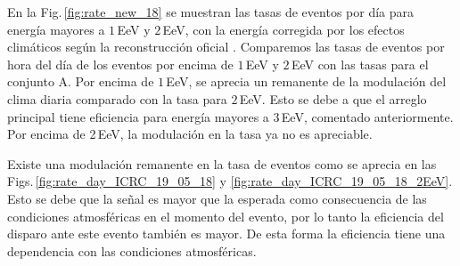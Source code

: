    En la Fig.\,\ref{fig:rate_new_18} se muestran las tasas de eventos por día para energía mayores a $1\,$EeV y $2\,$EeV, con la energía corregida por los efectos climáticos según la reconstrucción oficial \cite{data}.  Comparemos las tasas de eventos por hora del día de los eventos por encima de $1\,$EeV y $2\,$EeV con las tasas para el conjunto  A. Por encima de $1\,$EeV, se aprecia un remanente de la modulación del clima diaria comparado con la tasa para $2\,$EeV. Esto se debe a que el arreglo principal tiene eficiencia para energía mayores a $3\,$EeV, comentado anteriormente. Por encima de 2\,EeV, la modulación en la tasa ya no es apreciable. 


   Existe una modulación remanente en la tasa de eventos como se aprecia en las Figs.\,\ref{fig:rate_day_ICRC_19_05_18} y \ref{fig:rate_day_ICRC_19_05_18_2EeV}. Esto se debe que la señal es mayor que la esperada como consecuencia de las condiciones atmosféricas en el momento del evento, por lo tanto la eficiencia del disparo ante este evento también es mayor. De esta forma la eficiencia tiene una dependencia con las condiciones atmosféricas.

